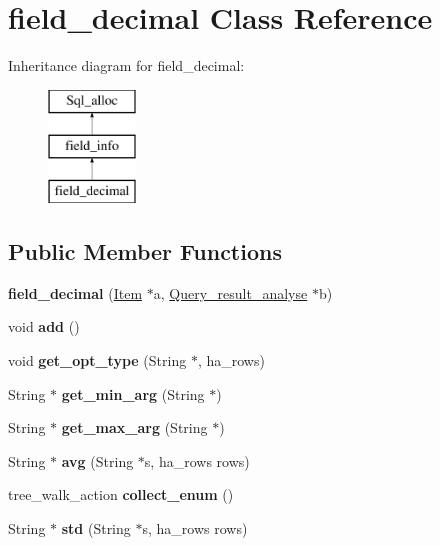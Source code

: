 \hypertarget{classfield__decimal}{}\section{field\+\_\+decimal Class Reference}
\label{classfield__decimal}
Inheritance diagram for field\+\_\+decimal\+:\begin{figure}[H]
\begin{center}
\leavevmode
\includegraphics[height=3.000000cm]{classfield__decimal}
\end{center}
\end{figure}
\subsection*{Public Member Functions}
\begin{DoxyCompactItemize}
\item 
\mbox{\label{classfield__decimal_afa7a7e0707d7760900916a2263d09ab6}} 
{\bfseries field\+\_\+decimal} (\mbox{\hyperlink{classItem}{Item}} $\ast$a, \mbox{\hyperlink{classQuery__result__analyse}{Query\+\_\+result\+\_\+analyse}} $\ast$b)
\item 
\mbox{\label{classfield__decimal_a3829f39776438dd6184b81f7fdb90a81}} 
void {\bfseries add} ()
\item 
\mbox{\label{classfield__decimal_a10a60c317c83bf8c3681044d60eedd26}} 
void {\bfseries get\+\_\+opt\+\_\+type} (String $\ast$, ha\+\_\+rows)
\item 
\mbox{\label{classfield__decimal_af97cc13e1c2c375dca9ac828ff0d4123}} 
String $\ast$ {\bfseries get\+\_\+min\+\_\+arg} (String $\ast$)
\item 
\mbox{\label{classfield__decimal_a3cab13a5eb620456602e3faba727e1e0}} 
String $\ast$ {\bfseries get\+\_\+max\+\_\+arg} (String $\ast$)
\item 
\mbox{\label{classfield__decimal_a28e2cfc4a0ba6840466527de77597d97}} 
String $\ast$ {\bfseries avg} (String $\ast$s, ha\+\_\+rows rows)
\item 
\mbox{\label{classfield__decimal_a04e6b2d91a211577e111eadf41e1b839}} 
tree\+\_\+walk\+\_\+action {\bfseries collect\+\_\+enum} ()
\item 
\mbox{\label{classfield__decimal_a94e534fcd13eecbfdb0056e837a5d0f5}} 
String $\ast$ {\bfseries std} (String $\ast$s, ha\+\_\+rows rows)
\end{DoxyCompactItemize}
